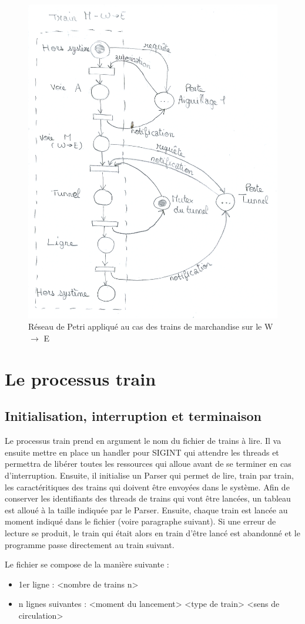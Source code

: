 \documentclass[a4paper,12pt]{article}
\begin{document}
\begin{figure}[!htbp]
	\centering
	\includegraphics[width=.5\linewidth]{img/reseau_petri.png}
	\caption{Réseau de Petri appliqué au cas des trains de marchandise sur le W $\rightarrow$ E}
\end{figure}

\section{Le processus train}

\subsection{Initialisation, interruption et terminaison}

Le processus train prend en argument le nom du fichier de trains à lire. Il va ensuite mettre en place un handler pour SIGINT qui attendre les threads et permettra de libérer toutes les ressources qui alloue avant de se terminer en cas d'interruption. Ensuite, il initialise un Parser qui permet de lire, train par train, les caractéritiques des trains qui doivent être envoyées dans le système. Afin de conserver les identifiants des threads de trains qui vont être lancées, un tableau est alloué à la taille indiquée par le Parser. Ensuite, chaque train est lancée au moment indiqué dans le fichier (voire paragraphe suivant). Si une erreur de lecture se produit, le train qui était alors en train d'être lancé est abandonné et le programme passe directement au train suivant.

Le fichier se compose de la manière suivante :

\begin{itemize}
	\item 1er ligne : <nombre de trains n>
	\item n lignes suivantes : <moment du lancement> <type de train> <sens de circulation>
\end{itemize}
\end{document}
